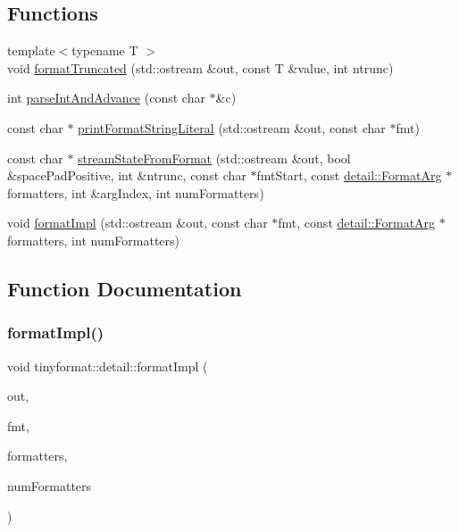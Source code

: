 \subsection*{Functions}
\begin{DoxyCompactItemize}
\item 
{\footnotesize template$<$typename T $>$ }\\void \mbox{\hyperlink{namespacetinyformat_1_1detail_a0a1c25572ad934e2db1c7baa69ae2856}{format\+Truncated}} (std\+::ostream \&out, const T \&value, int ntrunc)
\item 
int \mbox{\hyperlink{namespacetinyformat_1_1detail_a67285e0adb9f4164f9fc30a3eb11c771}{parse\+Int\+And\+Advance}} (const char $\ast$\&c)
\item 
const char $\ast$ \mbox{\hyperlink{namespacetinyformat_1_1detail_ad3d636b9f85202b515c8940b7fcb62a6}{print\+Format\+String\+Literal}} (std\+::ostream \&out, const char $\ast$fmt)
\item 
const char $\ast$ \mbox{\hyperlink{namespacetinyformat_1_1detail_a681e8ceb825485cc5e3b057c11e4b1b5}{stream\+State\+From\+Format}} (std\+::ostream \&out, bool \&space\+Pad\+Positive, int \&ntrunc, const char $\ast$fmt\+Start, const \mbox{\hyperlink{classtinyformat_1_1detail_1_1_format_arg}{detail\+::\+Format\+Arg}} $\ast$formatters, int \&arg\+Index, int num\+Formatters)
\item 
void \mbox{\hyperlink{namespacetinyformat_1_1detail_a079a316938c0e8693efbeb0183b1390d}{format\+Impl}} (std\+::ostream \&out, const char $\ast$fmt, const \mbox{\hyperlink{classtinyformat_1_1detail_1_1_format_arg}{detail\+::\+Format\+Arg}} $\ast$formatters, int num\+Formatters)
\end{DoxyCompactItemize}


\subsection{Function Documentation}
\mbox{\label{namespacetinyformat_1_1detail_a079a316938c0e8693efbeb0183b1390d}} 
\subsubsection{\texorpdfstring{format\+Impl()}{formatImpl()}}
{\footnotesize\ttfamily void tinyformat\+::detail\+::format\+Impl (\begin{DoxyParamCaption}\item[{std\+::ostream \&}]{out,  }\item[{const char $\ast$}]{fmt,  }\item[{const \mbox{\hyperlink{classtinyformat_1_1detail_1_1_format_arg}{detail\+::\+Format\+Arg}} $\ast$}]{formatters,  }\item[{int}]{num\+Formatters }\end{DoxyParamCaption})\hspace{0.3cm}{\ttfamily [inline]}}

